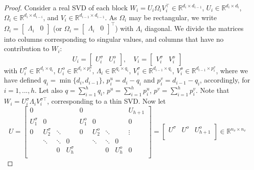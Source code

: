 \documentclass[10pt,a4paper]{amsart}
\begin{document}
\begin{proof}
Consider a real SVD of each block $W_i=U_i \Omega_iV_i^\top \in\mathbb{R}^{d_i\times d_{i-1}}$, $U_i\in\mathbb{R}^{d_i\times d_i}$, $\Omega_i\in\mathbb{R}^{d_i\times d_{i-i}}$, and $V_i\in\mathbb{R}^{d_{i-1}\times d_{i-1}}$. As $\Omega_i$ may be rectangular, we write $\Omega_i = \begin{bmatrix}
\Lambda_i & 0
\end{bmatrix}$ (or $\Omega_i = \begin{bmatrix}
\Lambda_i & 0
\end{bmatrix}^\top $) with $\Lambda_i$ diagonal. 
We divide the matrices into columns corresponding to singular values, and columns that have no contribution to $W_i$:
\begin{equation}
	U_i = \begin{bmatrix}
		U_i^\sigma & U_i^{o}
	\end{bmatrix}, \quad V_i = \begin{bmatrix}
		V_i^\sigma & V_i^{o}
	\end{bmatrix}
\end{equation}
with $U_i^\sigma \in\mathbb{R}^{d_i\times q_i}$, $U_i^{o}\in\mathbb{R}^{d_i\times p_i^u}$, $\Lambda_i\in\mathbb{R}^{q_i\times q_i}$, $V_i^\sigma \in\mathbb{R}^{d_{i-1}\times q_i}$, $V_i^{o}\in\mathbb{R}^{d_{i-1}\times p_i^v}$, where we have defined $q_i=\min\{d_i,d_{i-1}\}$, $p_i^u=d_i-q_i$ and $p_i^v=d_{i-1}-q_i$, accordingly, for $i=1,...,h$. Let also $q=\sum_{i=1}^h q_i$, $p^u=\sum_{i=1}^h p_i^u$, $p^v=\sum_{i=1}^h p_i^v$. Note that $W_i=U_i^\sigma \Lambda_iV_i^{\sigma \top}$, corresponding to a thin SVD. Now let
\begin{equation}
	U = 
	\left[
	\begin{array}{cccc|cccc|c}
		0 & & & & 0 & & & & U_{h+1} \\
		U_1^\sigma & 0 & & & U_{1}^o & 0 & & &0  \\
		0 & U_2^\sigma & \ddots & & 0 & U_{2}^o &\ddots  & & \vdots\\
		& \ddots & \ddots &0  & & \ddots & \ddots & 0 & \\
		& & 0 & U_h^\sigma & & & 0 & U_{h}^o & 0\\
	\end{array}
	\right] = \left[
	\begin{array}{c|c|c}
		U^\sigma & U^o & U_{h+1}^o \\
	\end{array}
	\right] \in\mathbb{R}^{n_v\times n_v}
    \label{eq:svd_U}
\end{equation}

\end{proof}
\end{document}
